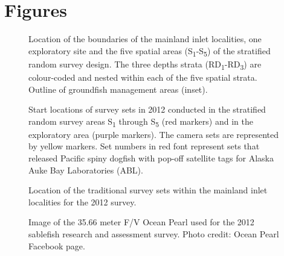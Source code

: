 \documentclass[12pt]{article}\usepackage[]{graphicx}\usepackage[]{color}
\begin{document}
\hypertarget{figures}{%
\section{Figures}\label{figures}}


\begin{figure}[htb]

{\centering {} 

}

\caption{Location of the boundaries of the mainland inlet localities, one exploratory site and the five spatial areas (S\textsubscript{1}-S\textsubscript{5}) of the stratified random survey design. The three depths strata (RD\textsubscript{1}-RD\textsubscript{3}) are colour-coded and nested within each of the five spatial strata. Outline of groundfish management areas (inset).}\label{fig:figure1}
\end{figure}
\clearpage


\begin{figure}[htb]

{\centering {} 

}

\caption{Start locations of survey sets in 2012 conducted in the stratified random survey areas S\textsubscript{1} through S\textsubscript{5} (red markers) and in the exploratory area (purple markers). The camera sets are represented by yellow markers. Set numbers in red font represent sets that released Pacific spiny dogfish with pop-off satellite tags for Alaska Auke Bay Laboratories (ABL).}\label{fig:figure2}
\end{figure}
\clearpage


\begin{figure}[htb]

{\centering {} 

}

\caption{Location of the traditional survey sets within the mainland inlet localities for the 2012 survey.}\label{fig:figure3}
\end{figure}
\clearpage


\begin{figure}[htb]

{\centering {} 

}

\caption{Image of the 35.66 meter F/V Ocean Pearl used for the 2012 sablefish research and assessment survey. Photo credit: Ocean Pearl Facebook page.}\label{fig:figure4}
\end{figure}
\clearpage
\end{document}
